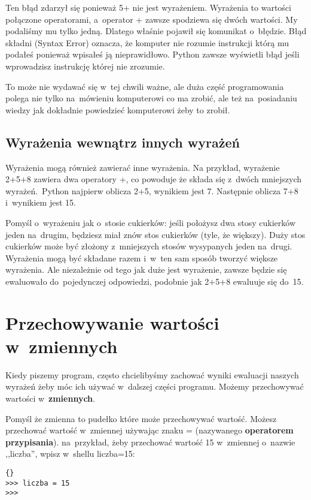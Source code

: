 \documentclass{book}
\begin{document}
Ten błąd zdarzył się ponieważ 5+ nie jest wyrażeniem. Wyrażenia to wartości połączone operatorami, a~operator + zawsze spodziewa się dwóch wartości. My podaliśmy mu tylko jedną. Dlatego właśnie pojawił się komunikat o~błędzie. Błąd składni (Syntax Error) oznacza, że komputer nie rozumie instrukcji którą mu podałeś ponieważ wpisałeś ją nieprawidłowo. Python zawsze wyświetli błąd jeśli wprowadzisz instrukcję której nie zrozumie.

To może nie wydawać się w~tej chwili ważne, ale duża część programowania polega nie tylko na~mówieniu komputerowi co ma zrobić, ale też na~posiadaniu wiedzy jak dokładnie powiedzieć komputerowi żeby to zrobił.

\subsection{Wyrażenia wewnątrz innych wyrażeń}

Wyrażenia mogą również zawierać inne wyrażenia. Na przykład, wyrażenie 2+5+8 zawiera dwa operatory +, co powoduje że składa się z~dwóch mniejszych wyrażeń.~Python najpierw oblicza 2+5, wynikiem jest 7. Następnie oblicza 7+8 i~wynikiem jest 15.

Pomyśl o~wyrażeniu jak o~stosie cukierków: jeśli położysz dwa stosy cukierków jeden na~drugim, będziesz miał znów stos cukierków (tyle, że większy). Duży stos cukierków może być złożony z~mniejszych stosów wysypanych jeden na~drugi. Wyrażenia mogą być składane razem i~w~ten sam sposób tworzyć większe wyrażenia. Ale niezależnie od tego jak duże jest wyrażenie, zawsze będzie się ewaluowało do~pojedynczej odpowiedzi, podobnie jak 2+5+8 ewaluuje się do~15.

\section{Przechowywanie wartości w~zmiennych}

Kiedy piszemy program, często chcielibyśmy zachować wyniki ewaluacji naszych wyrażeń żeby móc ich używać w~dalszej części programu. Możemy przechowywać wartości w~{\bf zmiennych}.

Pomyśl że zmienna to pudełko które może przechowywać wartość. Możesz przechować wartość w~zmiennej używając znaku = (nazywanego {\bf operatorem przypisania}). na~przykład, żeby przechować wartość 15 w~zmiennej o~nazwie ,,liczba'', wpisz w~shellu liczba=15:

\lstset{language=python}
\begin{lstlisting}{}
>>> liczba = 15
>>>
\end{lstlisting}
\end{document}
